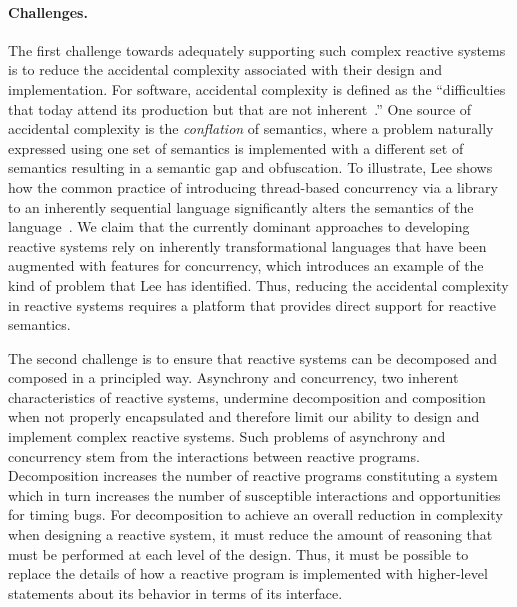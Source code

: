 \paragraph{Challenges.}
The first challenge towards adequately supporting such complex reactive systems is to reduce the accidental complexity associated with their design and implementation.
For software, accidental complexity is defined as the ``difficulties that today attend its production but that are not inherent~\cite{brooks1995mythical}.''
One source of accidental complexity is the \emph{conflation} of semantics, where a problem naturally expressed using one set of semantics is implemented with a different set of semantics resulting in a semantic gap and obfuscation.
To illustrate, Lee shows how the common practice of introducing thread-based concurrency via a library to an inherently sequential language significantly alters the semantics of the language~\cite{lee2006problem}.
We claim that the currently dominant approaches to developing reactive systems rely on inherently transformational languages that have been augmented with features for concurrency, which introduces an example of the kind of problem that Lee has identified.
Thus, reducing the accidental complexity in reactive systems requires a platform that provides direct support for reactive semantics.

The second challenge is to ensure that reactive systems can be decomposed and composed in a principled way.
Asynchrony and concurrency, two inherent characteristics of reactive systems, undermine decomposition and composition when not properly encapsulated and therefore limit our ability to design and implement complex reactive systems.
Such problems of asynchrony and concurrency stem from the interactions between reactive programs.
Decomposition increases the number of reactive programs constituting a system which in turn increases the number of susceptible interactions and opportunities for timing bugs.
For decomposition to achieve an overall reduction in complexity when designing a reactive system, it must reduce the amount of reasoning that must be performed at each level of the design.
Thus, it must be possible to replace the details of how a reactive program is implemented with higher-level statements about its behavior in terms of its interface.

